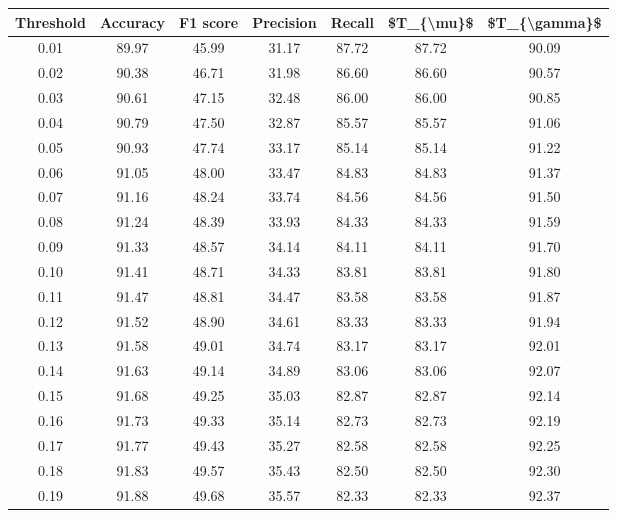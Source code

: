 \begin{tabular}{|c|c|c|c|c|c|c|}
\hline
 Threshold &  Accuracy &  F1 score &  Precision &  Recall &  \$T\_\{\textbackslash mu\}\$ &  \$T\_\{\textbackslash gamma\}\$ \\
\hline
      0.01 &     89.97 &     45.99 &      31.17 &   87.72 &      87.72 &         90.09 \\
      0.02 &     90.38 &     46.71 &      31.98 &   86.60 &      86.60 &         90.57 \\
      0.03 &     90.61 &     47.15 &      32.48 &   86.00 &      86.00 &         90.85 \\
      0.04 &     90.79 &     47.50 &      32.87 &   85.57 &      85.57 &         91.06 \\
      0.05 &     90.93 &     47.74 &      33.17 &   85.14 &      85.14 &         91.22 \\
      0.06 &     91.05 &     48.00 &      33.47 &   84.83 &      84.83 &         91.37 \\
      0.07 &     91.16 &     48.24 &      33.74 &   84.56 &      84.56 &         91.50 \\
      0.08 &     91.24 &     48.39 &      33.93 &   84.33 &      84.33 &         91.59 \\
      0.09 &     91.33 &     48.57 &      34.14 &   84.11 &      84.11 &         91.70 \\
      0.10 &     91.41 &     48.71 &      34.33 &   83.81 &      83.81 &         91.80 \\
      0.11 &     91.47 &     48.81 &      34.47 &   83.58 &      83.58 &         91.87 \\
      0.12 &     91.52 &     48.90 &      34.61 &   83.33 &      83.33 &         91.94 \\
      0.13 &     91.58 &     49.01 &      34.74 &   83.17 &      83.17 &         92.01 \\
      0.14 &     91.63 &     49.14 &      34.89 &   83.06 &      83.06 &         92.07 \\
      0.15 &     91.68 &     49.25 &      35.03 &   82.87 &      82.87 &         92.14 \\
      0.16 &     91.73 &     49.33 &      35.14 &   82.73 &      82.73 &         92.19 \\
      0.17 &     91.77 &     49.43 &      35.27 &   82.58 &      82.58 &         92.25 \\
      0.18 &     91.83 &     49.57 &      35.43 &   82.50 &      82.50 &         92.30 \\
      0.19 &     91.88 &     49.68 &      35.57 &   82.33 &      82.33 &         92.37 \\

\end{tabular}
